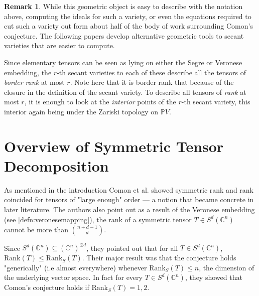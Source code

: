 \documentclass[12pt,a4paper,oneside]{book}
\def\complex{\mathbb{C}} %
\def\proj{\mathbb{P}} %
\def\field{\mathbb{F}} %
\def\rank{\text{Rank}} %
\def\srank{\text{Rank}_S} %
\theoremstyle{definition}
\newtheorem*{remark}{Remark}
\begin{document}
\begin{remark}
    While this geometric object is easy to describe with the notation above, computing the ideals for such a variety, or even the equations required to cut such a variety out form about half of the body of work surrounding Comon's conjecture. The following papers \cite{buczynska_secant_2013,buczynski_ranks_2013,bernardi_waring_2020} develop alternative geometric tools to secant varieties that are easier to compute.
\end{remark}
Since elementary tensors can be seen as lying on either the Segre or Veronese embedding, the $r$-th secant varieties to each of these describe all the tensors of \textit{border rank} at most $r$. Note here that it is border rank that because of the closure in the definition of the secant variety. To describe all tensors of \textit{rank} at most $r$, it is enough to look at the \textit{interior} points of the $r$-th secant variety, this interior again being under the Zariski topology on $\proj V$. 


\section{Overview of Symmetric Tensor Decomposition}\label{section:pastoverview}
As mentioned in the introduction Comon et al. \cite{comon_symmetric_2008} showed symmetric rank and rank coincided for tensors of "large enough" order --- a notion that became concrete in later literature. The authors also point out as a result of the Veronese embedding (see \cref{defn:veronesemapping}), the rank of a symmetric tensor $T \in S^d(\complex^n)$ cannot be more than $\binom{n + d - 1}{d}$. 


Since $S^d(\complex^n) \subseteq (\complex^{n})^{\otimes d}$, they pointed out that for all $T \in S^d(\complex^n)$, $\rank(T) \leq \srank(T)$. Their major result was that the conjecture holds "generically" (i.e almost everywhere) whenever $\srank(T) \leq n$, the dimension of the underlying vector space. In fact for every $T\in S^d(\complex^n)$, they showed that Comon's conjecture holds if $\srank(T) = 1,2$.
\end{document}

